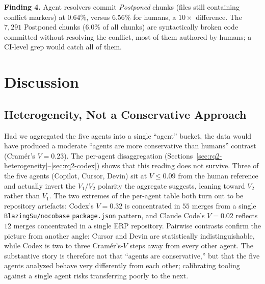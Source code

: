 \documentclass[sigconf,anonymous]{acmart}
\begin{document}
\begin{findingbox}
\textbf{Finding 4.} Agent resolvers commit \emph{Postponed} chunks (files still containing conflict markers) at $0.64\%$, versus $6.56\%$ for humans, a $10{\times}$ difference. The $7{,}291$ Postponed chunks ($6.0\%$ of all chunks) are syntactically broken code committed without resolving the conflict, most of them authored by humans; a CI-level grep would catch all of them.
\end{findingbox}

\section{Discussion}
\label{sec:discussion}

\subsection{Heterogeneity, Not a Conservative Approach}
\label{sec:disc-findings}

Had we aggregated the five agents into a single ``agent'' bucket, the data would have produced a moderate ``agents are more conservative than humans'' contrast (Cram\'{e}r's $V{=}0.23$). The per-agent disaggregation (Sections~\ref{sec:rq2-heterogeneity}--\ref{sec:rq2-codex}) shows that this reading does not survive. Three of the five agents (Copilot, Cursor, Devin) sit at $V{\leq}0.09$ from the human reference and actually invert the $V_1$/$V_2$ polarity the aggregate suggests, leaning toward $V_2$ rather than $V_1$. The two extremes of the per-agent table both turn out to be repository artefacts: Codex's $V{=}0.32$ is concentrated in $55$ merges from a single \texttt{BlazingSu/nocobase} \texttt{package.json} pattern, and Claude Code's $V{=}0.02$ reflects $12$ merges concentrated in a single ERP repository. Pairwise contrasts confirm the picture from another angle: Cursor and Devin are statistically indistinguishable, while Codex is two to three Cram\'{e}r's-$V$ steps away from every other agent. The substantive story is therefore not that ``agents are conservative,'' but that the five agents analyzed behave very differently from each other; calibrating tooling against a single agent risks transferring poorly to the next.
\end{document}
